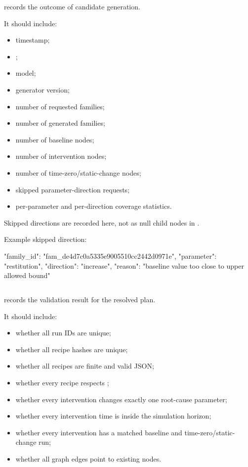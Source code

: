 \documentclass[11pt]{article}
\begin{document}
 records the outcome of candidate generation.

It should include:

\begin{itemize}
    \item timestamp;
    \item {};
    \item model;
    \item generator version;
    \item number of requested families;
    \item number of generated families;
    \item number of baseline nodes;
    \item number of intervention nodes;
    \item number of time-zero/static-change nodes;
    \item skipped parameter-direction requests;
    \item per-parameter and per-direction coverage statistics.
\end{itemize}

Skipped directions are recorded here, not as null child nodes in .

Example skipped direction:

\begin{DocCode}
{
  "family_id": "fam_de4d7c0a5335e9005510cc2442d0971e",
  "parameter": "restitution",
  "direction": "increase",
  "reason": "baseline value too close to upper allowed bound"
}
\end{DocCode}

\subsection*{}

 records the validation result for the resolved plan.

It should include:

\begin{itemize}
    \item whether all run IDs are unique;
    \item whether all recipe hashes are unique;
    \item whether all recipes are finite and valid JSON;
    \item whether every recipe respects ;
    \item whether every intervention changes exactly one root-cause parameter;
    \item whether every intervention time is inside the simulation horizon;
    \item whether every intervention has a matched baseline and time-zero/static-change run;
    \item whether all graph edges point to existing nodes.
\end{itemize}
\end{document}
